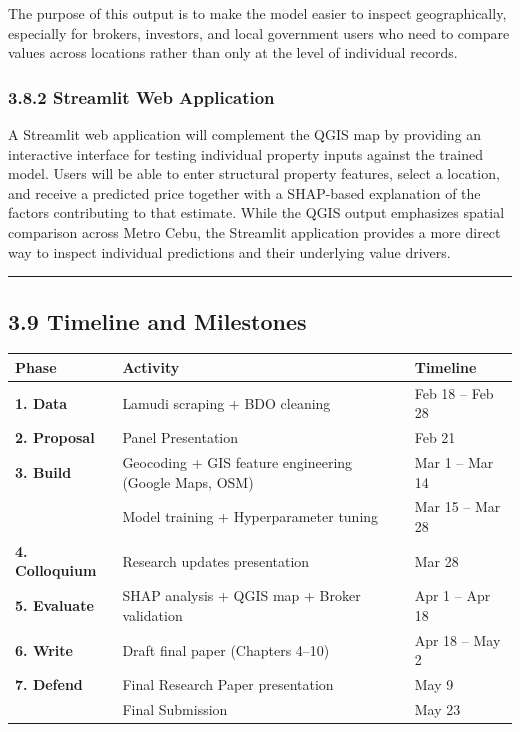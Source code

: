 The purpose of this output is to make the model easier to inspect geographically, especially for brokers, investors, and local government users who need to compare values across locations rather than only at the level of individual records.

\subsubsection{\texorpdfstring{\textbf{3.8.2 Streamlit Web Application}}{3.8.2 Streamlit Web Application}}\label{streamlit-web-application}

A Streamlit web application will complement the QGIS map by providing an interactive interface for testing individual property inputs against the trained model. Users will be able to enter structural property features, select a location, and receive a predicted price together with a SHAP-based explanation of the factors contributing to that estimate. While the QGIS output emphasizes spatial comparison across Metro Cebu, the Streamlit application provides a more direct way to inspect individual predictions and their underlying value drivers.

\begin{center}\rule{0.5\linewidth}{0.5pt}\end{center}

\subsection{\texorpdfstring{\textbf{3.9 Timeline and Milestones}}{3.9 Timeline and Milestones}}\label{timeline-and-milestones}

\begin{center}
\begin{tabular}{p{} p{} p{}}
\toprule
Phase & Activity & Timeline \\
\midrule
\textbf{1. Data} & Lamudi scraping + BDO cleaning & Feb 18 -- Feb 28 \\
\textbf{2. Proposal} & Panel Presentation & Feb 21 \\
\textbf{3. Build} & Geocoding + GIS feature engineering (Google Maps, OSM) & Mar 1 -- Mar 14 \\
 & Model training + Hyperparameter tuning & Mar 15 -- Mar 28 \\
\textbf{4. Colloquium} & Research updates presentation & Mar 28 \\
\textbf{5. Evaluate} & SHAP analysis + QGIS map + Broker validation & Apr 1 -- Apr 18 \\
\textbf{6. Write} & Draft final paper (Chapters 4--10) & Apr 18 -- May 2 \\
\textbf{7. Defend} & Final Research Paper presentation & May 9 \\
 & Final Submission & May 23 \\
\bottomrule
\end{tabular}
\end{center}
